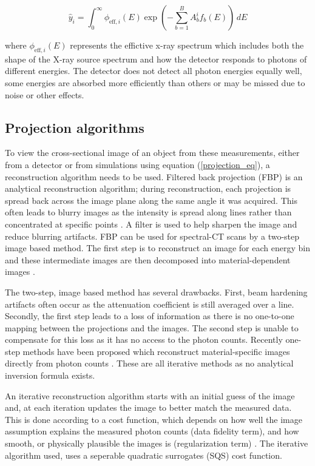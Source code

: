 \documentclass{article}
\begin{document}
\begin{equation}
\hat{y}_i = \int_0^{\infty} \phi_{\text{eff},i}(E) \exp\left( - \sum_{b=1}^{B} A_b^i f_b(E) \right) \, dE
\end{equation}

where $\phi_{\text{eff},i}(E)$ represents the effictive x-ray spectrum which includes both the shape of the X-ray source spectrum and how the detector responds to photons of different energies. The detector does not detect all photon energies equally well, some energies are absorbed more efficiently than others or may be missed due to noise or other effects.

\subsection{Projection algorithms}

To view the cross-sectional image of an object from these measurements, either from a detector or from simulations using equation (\ref{projection_eq}), a reconstruction algorithm needs to be used. Filtered back projection (FBP) is an analytical reconstruction algorithm; during reconstruction, each projection is spread back across the image plane along the same angle it was acquired. This often leads to blurry images as the intensity is spread along lines rather than concentrated at specific points \citep{zeng2001image}. A filter is used to help sharpen the image and reduce blurring artifacts. FBP can be used for spectral-CT scans by a two-step image based method. The first step is to reconstruct an image for each energy bin and these intermediate images are then decomposed into material-dependent images \citep{mory2018comparison}.

The two-step, image based method has several drawbacks. First, beam hardening artifacts often occur as the attenuation coefficient is still averaged over a line. Secondly, the first step leads to a loss of information as there is no one-to-one mapping between the projections and the images. The second step is unable to compensate for this loss as it has no access to the photon counts. Recently one-step methods have been proposed which reconstruct material-specific images directly from photon counts \citep{mechlem2018joint}. These are all iterative methods as no analytical inversion formula exists.

An iterative reconstruction algorithm starts with an initial guess of the image and, at each iteration updates the image to better match the measured data. This is done according to a cost function, which depends on how well the image assumption explains the measured photon counts (data fidelity term), and how smooth, or physically plausible the images is (regularization term) \citep{Zhang2018Regularization}. The iterative algorithm used, uses a seperable quadratic surrogates (SQS) cost function.
\end{document}

